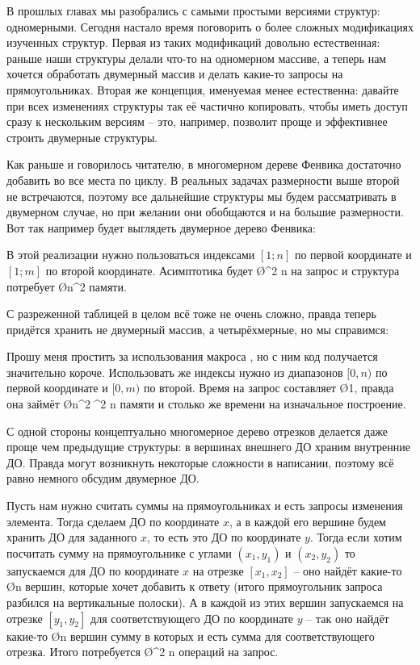 В прошлых главах мы разобрались с самыми простыми версиями структур: одномерными. Сегодня настало время поговорить о более сложных модификациях изученных структур. Первая из таких модификаций довольно естественная: раньше наши структуры делали что-то на одномерном массиве, а теперь нам хочется обработать двумерный массив и делать какие-то запросы на прямоугольниках. Вторая же концепция, именуемая  менее естественна: давайте при всех изменениях структуры так её частично копировать, чтобы иметь доступ сразу к нескольким версиям -- это, например, позволит проще и эффективнее строить двумерные структуры.


Как раньше и говорилось читателю, в многомерном дереве Фенвика достаточно добавить во все места по циклу. В реальных задачах размерности выше второй не встречаются, поэтому все дальнейшие структуры мы будем рассматривать в двумерном случае, но при желании они обобщаются и на большие размерности. Вот так например будет выглядеть двумерное дерево Фенвика:


В этой реализации нужно пользоваться индексами $[1; n]$ по первой координате и $[1; m]$ по второй координате. Асимптотика будет \O{\log^2 n} на запрос и структура потребует \O{n^2} памяти.


С разреженной таблицей в целом всё тоже не очень сложно, правда теперь придётся хранить не двумерный массив, а четырёхмерные, но мы справимся:


Прошу меня простить за использования макроса , но с ним код получается значительно короче. Использовать же индексы нужно из диапазонов $[0, n)$ по первой координате и $[0, m)$ по второй. Время на запрос составляет \O{1}, правда она займёт \O{n^2 \log^2 n} памяти и столько же времени на изначальное построение.


С одной стороны концептуально многомерное дерево отрезков делается даже проще чем предыдущие структуры: в вершинах внешнего ДО храним внутренние ДО. Правда могут возникнуть некоторые сложности в написании, поэтому всё равно немного обсудим двумерное ДО.

Пусть нам нужно считать суммы на прямоугольниках и есть запросы изменения элемента. Тогда сделаем ДО по координате $x$, а в каждой его вершине будем хранить ДО для заданного $x$, то есть это ДО по координате $y$. Тогда если хотим посчитать сумму на прямоугольнике с углами $(x_1, y_1)$ и $(x_2, y_2)$ то запускаемся для ДО по координате $x$ на отрезке $[x_1, x_2]$ -- оно найдёт какие-то \O{\log n} вершин, которые хочет добавить к ответу (итого прямоугольник запроса разбился на вертикальные полоски). А в каждой из этих вершин запускаемся на отрезке $[y_1, y_2]$ для соответствующего ДО по координате $y$ -- так оно найдёт какие-то \O{\log n} вершин сумму в которых и есть сумма для соответствующего отрезка. Итого потребуется \O{\log^2 n} операций на запрос.

